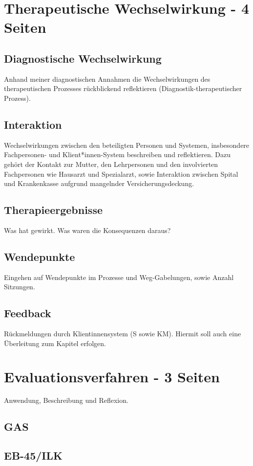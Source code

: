 \section{Therapeutische Wechselwirkung - 4 Seiten}
\subsection{Diagnostische Wechselwirkung} Anhand meiner diagnostischen Annahmen die Wechselwirkungen des therapeutischen Prozesses rückblickend reflektieren (Diagnostik-therapeutischer Prozess). 
\subsection{Interaktion} Wechselwirkungen zwischen den beteiligten Personen und Systemen, insbesondere Fachpersonen- und Klient*innen-System beschreiben und reflektieren. Dazu gehört der Kontakt zur Mutter, den Lehrpersonen und den involvierten Fachpersonen wie Hausarzt und Spezialarzt, sowie Interaktion zwischen Spital und Krankenkasse aufgrund mangelnder Versicherungsdeckung.
\subsection{Therapieergebnisse} Was hat gewirkt. Was waren die Konsequenzen daraus?
\subsection{Wendepunkte} Eingehen auf Wendepunkte im Prozesse und Weg-Gabelungen, sowie Anzahl Sitzungen.
\subsection{Feedback} Rückmeldungen durch Klientinnensystem (S sowie KM). Hiermit soll auch eine Überleitung zum Kapitel  erfolgen.


\section{Evaluationsverfahren - 3 Seiten}\label{Evaluationsverfahren}
Anwendung, Beschreibung und Reflexion.
\subsection{GAS}
\subsection{EB-45/ILK}


